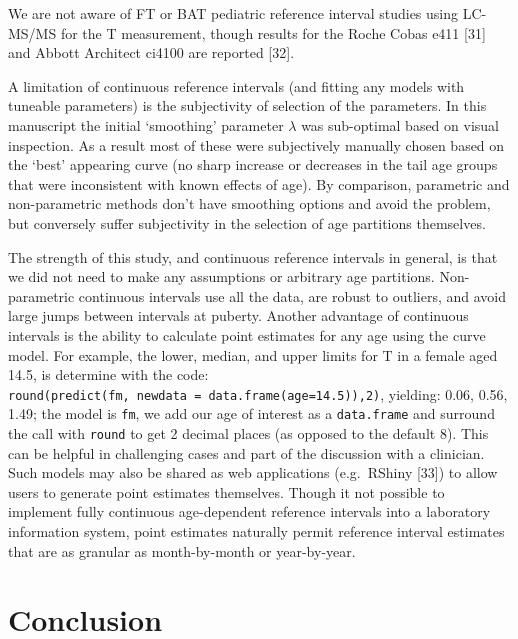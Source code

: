 \documentclass[]{elsarticle} %
\begin{document}
We are not aware of FT or BAT pediatric reference interval studies using
LC-MS/MS for the T measurement, though results for the Roche Cobas e411
{[}31{]} and Abbott Architect ci4100 are reported {[}32{]}.

A limitation of continuous reference intervals (and fitting any models
with tuneable parameters) is the subjectivity of selection of the
parameters. In this manuscript the initial `smoothing' parameter
\(\lambda\) was sub-optimal based on visual inspection. As a result most
of these were subjectively manually chosen based on the `best' appearing
curve (no sharp increase or decreases in the tail age groups that were
inconsistent with known effects of age). By comparison, parametric and
non-parametric methods don't have smoothing options and avoid the
problem, but conversely suffer subjectivity in the selection of age
partitions themselves.

The strength of this study, and continuous reference intervals in
general, is that we did not need to make any assumptions or arbitrary
age partitions. Non-parametric continuous intervals use all the data,
are robust to outliers, and avoid large jumps between intervals at
puberty. Another advantage of continuous intervals is the ability to
calculate point estimates for any age using the curve model. For
example, the lower, median, and upper limits for T in a female aged
14.5, is determine with the code:
\texttt{round(predict(fm,\ newdata\ =\ data.frame(age=14.5)),2)},
yielding: 0.06, 0.56, 1.49; the model is \texttt{fm}, we add our age of
interest as a \texttt{data.frame} and surround the call with
\texttt{round} to get 2 decimal places (as opposed to the default 8).
This can be helpful in challenging cases and part of the discussion with
a clinician. Such models may also be shared as web applications
(e.g.~RShiny {[}33{]}) to allow users to generate point estimates
themselves. Though it not possible to implement fully continuous
age-dependent reference intervals into a laboratory information system,
point estimates naturally permit reference interval estimates that are
as granular as month-by-month or year-by-year.

\hypertarget{conclusion}{%
\section{Conclusion}\label{conclusion}}
\end{document}

